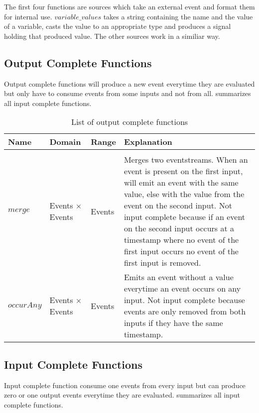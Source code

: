 The first four functions are sources which take an external event and format them for internal use.
\(\mathit{variable\_values}\) takes a string containing the name and the value of a variable, casts the value to an appropriate type and produces a signal holding that produced value.
The other sources work in a similiar way.

\subsection{Output Complete Functions}
\label{sec:definitions:tessla_functions:output_complete}

Output complete functions will produce a new event everytime they are evaluated but only have to consume events from some inputs and not from all.
 summarizes all input complete functions.

\begin{table}[!htb]
  \begin{tabularx}{\textwidth}{lllX}
    Name                 & Domain        & Range   & Explanation \\
    \toprule \\
    \(\mathit{merge}\)            & Events \(\times\) Events  & Events  & Merges two eventstreams. When an event is present on the first input, will emit an event with the same value, else with the value from the event on the second input. Not input complete because if an event on the second input occurs at a timestamp where no event of the first input occurs no event of the first input is removed. \\
    \(\mathit{occurAny}\)         & Events \(\times\) Events  & Events  & Emits an event without a value everytime an event occurs on any input. Not input complete because events are only removed from both inputs if they have the same timestamp. \\
  \end{tabularx}
\caption{List of output complete functions}
\label{table:output_complete_functions}
\end{table}


\subsection{Input Complete Functions}
\label{sec:definitions:tessla_functions:input_complete}

Input complete function consume one events from every input but can produce zero or one output events everytime they are evaluated.
 summarizes all input complete functions.


